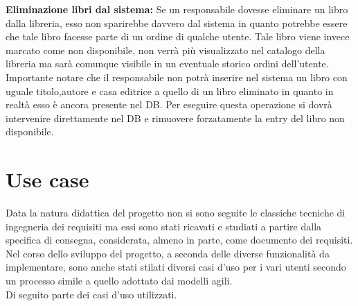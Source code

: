 \documentclass[a4paper,12pt,titlepage]{article}
\begin{document}
\textbf{Eliminazione libri dal sistema: }Se un responsabile dovesse eliminare un libro dalla libreria, esso non sparirebbe davvero dal sistema in quanto potrebbe essere che tale libro facesse parte di un ordine di qualche utente. Tale libro viene invece marcato come non disponibile, non verrà più visualizzato nel catalogo della libreria ma sarà comunque visibile in un eventuale storico ordini dell'utente. Importante notare che il responsabile non potrà inserire nel sistema un libro con uguale titolo,autore e casa editrice a quello di un libro eliminato in quanto in realtà esso è ancora presente nel DB. Per eseguire questa operazione si dovrà intervenire direttamente nel DB e rimuovere forzatamente la entry del libro non disponibile.

\cleardoublepage

\section{Use case}\label{sec:casiduso}
Data la natura didattica del progetto non si sono seguite le classiche tecniche di ingegneria dei requisiti ma essi sono stati ricavati e studiati a partire dalla specifica di consegna, considerata, almeno in parte, come documento dei requisiti.
Nel corso dello sviluppo del progetto, a seconda delle diverse funzionalità da implementare,
sono anche stati stilati diversi casi d’uso per i vari utenti secondo un processo simile a quello
adottato dai modelli agili.\\
Di seguito parte dei casi d’uso utilizzati.
\vspace{0.3cm}
\end{document}
